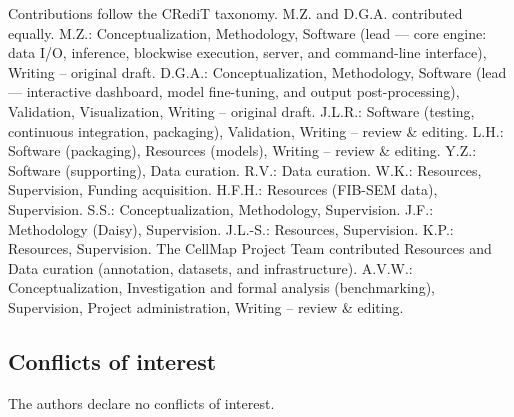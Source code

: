 Contributions follow the CRediT taxonomy. M.Z. and D.G.A. contributed equally. M.Z.: Conceptualization, Methodology, Software (lead --- core engine: data I/O, inference, blockwise execution, server, and command-line interface), Writing -- original draft. D.G.A.: Conceptualization, Methodology, Software (lead --- interactive dashboard, model fine-tuning, and output post-processing), Validation, Visualization, Writing -- original draft. J.L.R.: Software (testing, continuous integration, packaging), Validation, Writing -- review \& editing. L.H.: Software (packaging), Resources (models), Writing -- review \& editing. Y.Z.: Software (supporting), Data curation. R.V.: Data curation. W.K.: Resources, Supervision, Funding acquisition. H.F.H.: Resources (FIB-SEM data), Supervision. S.S.: Conceptualization, Methodology, Supervision. J.F.: Methodology (Daisy), Supervision. J.L.-S.: Resources, Supervision. K.P.: Resources, Supervision. The CellMap Project Team contributed Resources and Data curation (annotation, datasets, and infrastructure). A.V.W.: Conceptualization, Investigation and formal analysis (benchmarking), Supervision, Project administration, Writing -- review \& editing.

\subsection*{Conflicts of interest}

The authors declare no conflicts of interest.
